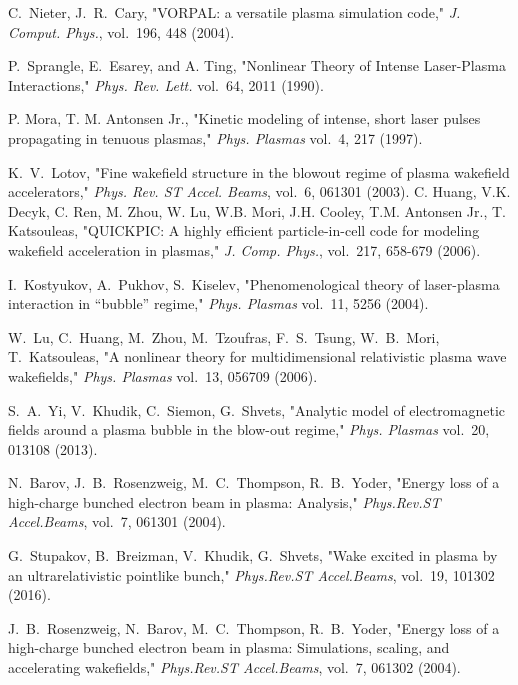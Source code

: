 \documentclass[twocolumn,showpacs,aip]{revtex4}
\begin{document}
\begin{thebibliography}{10}
  C.~Nieter, J.~R.~Cary, "VORPAL: a versatile plasma simulation code," 
  {\em J. Comput. Phys.}, vol.~196, 448 (2004).

P.~Sprangle, E.~Esarey, and A. Ting, "Nonlinear Theory of Intense Laser-Plasma Interactions,"	
	{\em Phys. Rev. Lett.} vol.~64, 2011 (1990).

			
			P. Mora, T. M. Antonsen Jr., "Kinetic modeling of intense, short laser pulses propagating in tenuous plasmas," 
			{\em Phys. Plasmas} vol.~4, 217 (1997).
			
	K.~V.~Lotov, "Fine wakefield structure in the blowout regime of plasma wakefield accelerators,"
	{\em Phys. Rev. ST Accel. Beams}, vol.~6, 061301 (2003).
C. Huang, V.K. Decyk, C. Ren, M. Zhou, W. Lu, W.B. Mori,
J.H. Cooley, T.M. Antonsen Jr., T. Katsouleas, "QUICKPIC: A highly efficient particle-in-cell code for
modeling wakefield acceleration in plasmas," 	
{\em J. Comp. Phys.}, vol.~217, 658-679 (2006).		
			
  I.~Kostyukov, A.~Pukhov, S.~Kiselev, "Phenomenological theory of laser-plasma interaction in “bubble” regime,"
 {\em Phys. Plasmas} vol.~11, 5256 (2004).

    W.~Lu, C.~Huang, M.~Zhou, M.~Tzoufras, F.~S.~Tsung, W.~B.~Mori, T.~Katsouleas, "A nonlinear theory for multidimensional relativistic plasma wave wakefields," 
    {\em Phys. Plasmas}  vol.~13, 056709 (2006).


    S.~A.~Yi, V.~Khudik, C.~Siemon, G.~Shvets, "Analytic model of electromagnetic fields around a plasma bubble in the blow-out regime," 
    {\em Phys. Plasmas} vol.~20, 013108 (2013).
		
   N.~Barov, J.~B.~Rosenzweig, M.~C.~Thompson, R.~B.~Yoder, "Energy loss of a high-charge bunched electron beam in plasma: Analysis,"
   {\em Phys.Rev.ST Accel.Beams}, vol.~7, 061301 (2004).

   G.~Stupakov, B.~Breizman, V.~Khudik, G.~Shvets, "Wake excited in plasma by an ultrarelativistic pointlike bunch,"
   {\em Phys.Rev.ST Accel.Beams}, vol.~19, 101302 (2016).

   J.~B.~Rosenzweig, N.~Barov, M.~C.~Thompson, R.~B.~Yoder, "Energy loss of a high-charge bunched electron beam in plasma: Simulations, scaling, and accelerating wakefields,"
   {\em Phys.Rev.ST Accel.Beams}, vol.~7, 061302 (2004).


\end{thebibliography}
\end{document}
